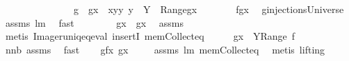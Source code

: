 \begin{isabellebody}
\ \ \ \ \ \ \ \ \ \ \ \ \ \ \ {\isachardoublequoteopen}g\ {\isasymin}\ {\isacharbraceleft}g{\isacharminus}{\isacharminus}x\ {\isasymunion}\ {\isacharbraceleft}{\isacharparenleft}x{\isacharcomma}y{\isacharparenright}{\isacharbraceright}{\isacharbar}y{\isachardot}\ y\ {\isasymin}\ Y\ {\isacharminus}\ {\isacharparenleft}Range{\isacharparenleft}g{\isacharminus}{\isacharminus}x{\isacharparenright}{\isacharparenright}{\isacharbraceright}{\isachardoublequoteclose}\ \isanewline
%
\isadelimproof
%
\endisadelimproof
%
\isatagproof
{}\isamarkupfalse%
\ {\isacharminus}\ \isanewline
\ \ \isamarkupfalse%
\ {\isacharquery}f{\isacharequal}{\isachardoublequoteopen}g{\isacharminus}{\isacharminus}x{\isachardoublequoteclose}\ \isamarkupfalse%
\ {\isachardoublequoteopen}g{\isasymin}injectionsUniverse{\isachardoublequoteclose}\ \isamarkupfalse%
\ assms{\isacharparenleft}{}{\isacharparenright}\ lm{}{}\ \isamarkupfalse%
\ fast\ \isamarkupfalse%
\ \isamarkupfalse%
\ \isamarkupfalse%
\ \isanewline
\ \ {\isachardoublequoteopen}g{\isacharcomma}{\isacharcomma}x\ {\isasymin}\ g{\isacharbackquote}{\isacharbackquote}{\isacharbraceleft}x{\isacharbraceright}{\isachardoublequoteclose}\ \isamarkupfalse%
\ assms{\isacharparenleft}{}{\isacharparenright}\ \isamarkupfalse%
\ {\isacharparenleft}metis\ Image{\isacharunderscore}runiq{\isacharunderscore}eq{\isacharunderscore}eval\ insertI{}\ mem{\isacharunderscore}Collect{\isacharunderscore}eq{\isacharparenright}\isanewline
\ \ \isamarkupfalse%
\ \isamarkupfalse%
\ {\isachardoublequoteopen}g{\isacharcomma}{\isacharcomma}x\ {\isasymin}\ Y{\isacharminus}Range\ {\isacharquery}f{\isachardoublequoteclose}\ \isamarkupfalse%
\ nn{}{}b\ assms{\isacharparenleft}{}{\isacharparenright}\ \isamarkupfalse%
\ fast\ \isamarkupfalse%
\ \isamarkupfalse%
\ {\isachardoublequoteopen}g{\isacharequal}{\isacharquery}f{\isasymunion}{\isacharbraceleft}{\isacharparenleft}x{\isacharcomma}\ g{\isacharcomma}{\isacharcomma}x{\isacharparenright}{\isacharbraceright}{\isachardoublequoteclose}\ \isanewline
\ \ \isamarkupfalse%
\ assms\ lm{}{}\ mem{\isacharunderscore}Collect{\isacharunderscore}eq\ \isamarkupfalse%
\ {\isacharparenleft}metis\ {\isacharparenleft}lifting{\isacharparenright}{\isacharparenright}\ \isamarkupfalse%

\end{isabellebody}
